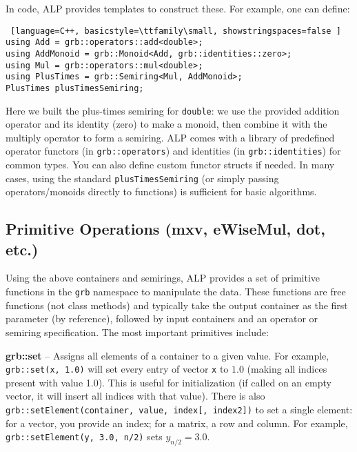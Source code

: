 In code, ALP provides templates to construct these. For example, one can define:
\begin{lstlisting} [language=C++, basicstyle=\ttfamily\small, showstringspaces=false ]
using Add = grb::operators::add<double>;
using AddMonoid = grb::Monoid<Add, grb::identities::zero>;
using Mul = grb::operators::mul<double>;
using PlusTimes = grb::Semiring<Mul, AddMonoid>;
PlusTimes plusTimesSemiring;
\end{lstlisting}
Here we built the plus-times semiring for \texttt{double}: we use the provided addition operator and its identity (zero) to make a monoid, then combine it with the multiply operator to form a semiring. ALP comes with a library of predefined operator functors (in \texttt{grb::operators}) and identities (in \texttt{grb::identities}) for common types. You can also define custom functor structs if needed. In many cases, using the standard \texttt{plusTimesSemiring} (or simply passing operators/monoids directly to functions) is sufficient for basic algorithms.

\subsection{Primitive Operations (mxv, eWiseMul, dot, etc.)}

Using the above containers and semirings, ALP provides a set of primitive functions in the \texttt{grb} namespace to manipulate the data. These functions are free functions (not class methods) and typically take the output container as the first parameter (by reference), followed by input containers and an operator or semiring specification. The most important primitives include:

    \textbf{grb::set} – Assigns all elements of a container to a given value. For example, \texttt{grb::set(x, 1.0)} will set every entry of vector \texttt{x} to $1.0$ (making all indices present with value 1.0). This is useful for initialization (if called on an empty vector, it will insert all indices with that value). There is also \texttt{grb::setElement(container, value, index[, index2])} to set a single element: for a vector, you provide an index; for a matrix, a row and column. For example, \texttt{grb::setElement(y, 3.0, n/2)} sets $y_{n/2} = 3.0$.
\newline

